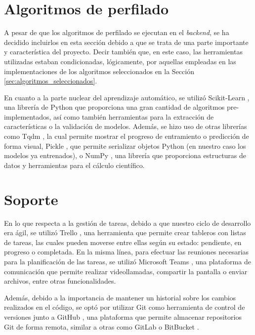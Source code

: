 \section{Algoritmos de perfilado}
\label{sec:herramientas_algoritmos}

A pesar de que los algoritmos de perfilado se ejecutan en el \textit{backend}, se ha decidido incluirlos en esta sección debido a que se trata de una parte
importante y característica del proyecto. Decir también que, en este caso, las herramientas utilizadas estaban condicionadas, lógicamente,
por aquellas empleadas en las implementaciones de los algoritmos seleccionados en la Sección \ref{sec:algoritmos_seleccionados}.

\bigskip
En cuanto a la parte nuclear del aprendizaje automático, se utilizó Scikit-Learn \cite{scikitlearn}, una librería de Python que proporciona una gran cantidad
de algoritmos pre-implementados, así como también herramientas para la extracción de características o la validación de modelos. Además, se hizo uso
de otras librerías como Tqdm \cite{tqdm}, la cual permite mostrar el progreso de entramiento o predicción de forma visual, Pickle \cite{pickle}, que permite
serializar objetos Python (en nuestro caso los modelos ya entrenados), o NumPy \cite{numpy}, una librería que proporciona estructuras de datos y herramientas para el cálculo científico.

\section{Soporte}
\label{sec:herramientas_soporte}

En lo que respecta a la gestión de tareas, debido a que nuestro ciclo de desarrollo era ágil, se utilizó Trello \cite{trello}, una herramienta que permite crear tableros con listas de tareas, las cuales pueden moverse
entre ellas según su estado: pendiente, en progreso o completada. En la misma línea, para efectuar las reuniones necesarias para la planificación de las tareas, se utilizó Microsoft Teams \cite{teams}, una plataforma
de comunicación que permite realizar videollamadas, compartir la pantalla o enviar archivos, entre otras funcionalidades.

\bigskip
Además, debido a la importancia de mantener un historial sobre los cambios realizados en el código, se optó por utilizar Git \cite{git} como herramienta de control de versiones junto a GitHub \cite{github}, una plataforma que permite
almacenar repositorios Git de forma remota, similar a otras como GitLab \cite{gitlab} o BitBucket \cite{bitbucket}.


